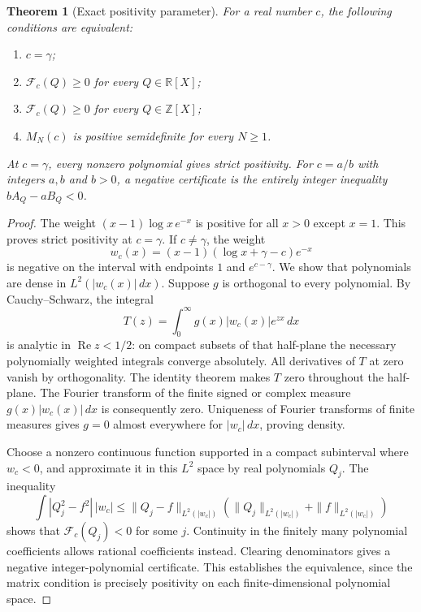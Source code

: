 \documentclass[11pt,a4paper]{article}
\newtheorem{theorem}{Theorem}[section]
\theoremstyle{definition}
\theoremstyle{remark}
\numberwithin{equation}{section}
\begin{document}
\begin{theorem}[Exact positivity parameter]\label{p5:thm:canonical-positivity}
For a real number $c$, the following conditions are equivalent:
\begin{enumerate}
 \item $c=\gamma$;
 \item $\mathcal F_c(Q)\geq0$ for every $Q\in\mathbb R[X]$;
 \item $\mathcal F_c(Q)\geq0$ for every $Q\in\mathbb Z[X]$;
 \item $M_N(c)$ is positive semidefinite for every $N\geq1$.
\end{enumerate}
At $c=\gamma$, every nonzero polynomial gives strict positivity.
For $c=a/b$ with integers $a,b$ and $b>0$, a negative certificate is
the entirely integer inequality $bA_Q-aB_Q<0$.
\end{theorem}
\begin{proof}
The weight $(x-1)\log x\,e^{-x}$ is positive for all $x>0$
except $x=1$.  This proves strict positivity at $c=\gamma$.
If $c\ne\gamma$, the weight
\[
 w_c(x)=(x-1)(\log x+\gamma-c)e^{-x}
\]
is negative on the interval with endpoints $1$ and $e^{c-\gamma}$.
We show that polynomials are dense in $L^2(|w_c(x)|\,dx)$.
Suppose $g$ is orthogonal to every polynomial.  By
Cauchy--Schwarz, the integral
\[
 T(z)=\int_0^\infty g(x)|w_c(x)|e^{zx}\,dx
\]
is analytic in $\operatorname{Re}z<1/2$: on compact subsets of
that half-plane the necessary polynomially weighted integrals
converge absolutely.  All derivatives of $T$ at zero vanish by
orthogonality.  The identity theorem makes $T$ zero throughout
the half-plane.  The Fourier transform of the finite signed or
complex measure $g(x)|w_c(x)|\,dx$ is consequently zero.
Uniqueness of Fourier transforms of finite measures gives $g=0$
almost everywhere for $|w_c|\,dx$, proving density.

Choose a nonzero continuous function supported in a compact
subinterval where $w_c<0$, and approximate it in this $L^2$ space
by real polynomials $Q_j$.  The inequality
\[
 \int |Q_j^2-f^2|\,|w_c|
 \leq \|Q_j-f\|_{L^2(|w_c|)}
       (\|Q_j\|_{L^2(|w_c|)}+\|f\|_{L^2(|w_c|)})
\]
shows that $\mathcal F_c(Q_j)<0$ for some $j$.
Continuity in the finitely many polynomial coefficients allows
rational coefficients instead.  Clearing denominators gives a
negative integer-polynomial certificate.  This establishes the
equivalence, since the matrix condition is precisely positivity
on each finite-dimensional polynomial space.
\end{proof}
\end{document}
